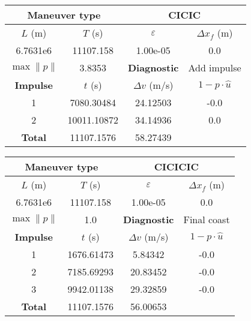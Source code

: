 \begin{table}[htpb]
    \centering
    \begin{tabular}{cccc} \toprule
    \multicolumn{2}{c}{\textbf{Maneuver type}} & \multicolumn{2}{c}{CICIC} \\ \midrule
    \(L\) (m) & \(T\) (s) & \(\varepsilon\) & \(\Delta x_{f}\) (m)    \\ \midrule
    6.7631e6          & 11107.158          & 1.00e-05                & 0.0                        \\ \midrule
    \(\max \lVert p \rVert\) & 3.8353     & \textbf{Diagnostic}   & Add impulse        \\ \midrule
    \textbf{Impulse} & \(t\) (s) & \(\Delta v\) (m/s) & \(1 - p \cdot \hat{u}\) \\ \midrule
    1                 & 7080.30484          & 24.12503             & -0.0                    \\
    2                 & 10011.10872          & 34.14936             & 0.0                    \\\midrule
    \textbf{Total}   & 11107.1576          & 58.27439             &                     \\ \bottomrule   
    \end{tabular}
\end{table}


\begin{table}[htpb]
    \centering
    \begin{tabular}{cccc} \toprule
    \multicolumn{2}{c}{\textbf{Maneuver type}} & \multicolumn{2}{c}{CICICIC} \\ \midrule
    \(L\) (m) & \(T\) (s) & \(\varepsilon\) & \(\Delta x_{f}\) (m)    \\ \midrule
    6.7631e6          & 11107.158          & 1.00e-05                & 0.0                        \\ \midrule
    \(\max \lVert p \rVert\) & 1.0     & \textbf{Diagnostic}   & Final coast        \\ \midrule
    \textbf{Impulse} & \(t\) (s) & \(\Delta v\) (m/s) & \(1 - p \cdot \hat{u}\) \\ \midrule
    1                 & 1676.61473          & 5.84342             & -0.0                    \\
    2                 & 7185.69293          & 20.83452             & -0.0                    \\
    3                 & 9942.01138          & 29.32859             & -0.0                    \\\midrule
    \textbf{Total}   & 11107.1576          & 56.00653             &                     \\ \bottomrule   
    \end{tabular}
\end{table}


